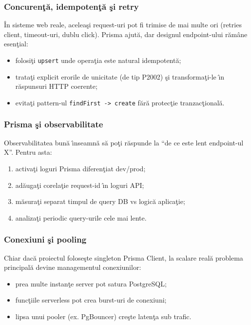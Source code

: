 \documentclass[12pt,onecolumn,draftclsnofoot]{IEEEtran}
\begin{document}
\subsubsection{Concuren\c{t}\u{a}, idempoten\c{t}\u{a} \c{s}i retry}
\^{I}n sisteme web reale, acelea\c{s}i request-uri pot fi trimise de mai multe ori (retries client, timeout-uri, dublu click). Prisma ajut\u{a}, dar designul endpoint-ului r\u{a}m\^{a}ne esen\c{t}ial:
\begin{itemize}
  \item folosi\c{t}i \texttt{upsert} unde opera\c{t}ia este natural idempotent\u{a};
  \item trata\c{t}i explicit erorile de unicitate (de tip P2002) \c{s}i transforma\c{t}i-le \^{\i}n r\u{a}spunsuri HTTP coerente;
  \item evita\c{t}i pattern-ul \texttt{findFirst -> create} f\u{a}r\u{a} protec\c{t}ie tranzac\c{t}ional\u{a}.
\end{itemize}

\subsubsection{Prisma \c{s}i observabilitate}
Observabilitatea bun\u{a} \^{\i}nseamn\u{a} s\u{a} po\c{t}i r\u{a}spunde la \enquote{de ce este lent endpoint-ul X}. Pentru asta:
\begin{enumerate}[label=\arabic*)]
  \item activa\c{t}i loguri Prisma diferen\c{t}iat dev/prod;
  \item ad\u{a}uga\c{t}i corela\c{t}ie request-id \^{\i}n loguri API;
  \item m\u{a}sura\c{t}i separat timpul de query DB vs logic\u{a} aplica\c{t}ie;
  \item analiza\c{t}i periodic query-urile cele mai lente.
\end{enumerate}

\subsubsection{Conexiuni \c{s}i pooling}
Chiar dac\u{a} proiectul folose\c{s}te singleton Prisma Client, la scalare real\u{a} problema principal\u{a} devine managementul conexiunilor:
\begin{itemize}
  \item prea multe instan\c{t}e server pot satura PostgreSQL;
  \item func\c{t}iile serverless pot crea burst-uri de conexiuni;
  \item lipsa unui pooler (ex. PgBouncer) cre\c{s}te laten\c{t}a sub trafic.
\end{itemize}
\end{document}

